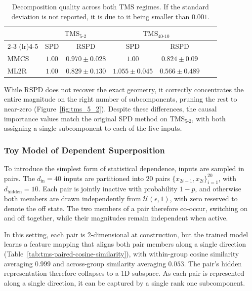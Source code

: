 \documentclass{article}
\begin{document}
\begin{table}[H]
\centering
\renewcommand{\arraystretch}{1.2}
\begin{tabular}{lcccccc}
\toprule
& \multicolumn{2}{c}{$\mathrm{TMS}_{5\text{-}2}$} & \multicolumn{2}{c}{$\mathrm{TMS}_{40\text{-}10}$} \\
\cmidrule(lr){2-3} \cmidrule(lr){4-5}
& SPD & RSPD & SPD & RSPD \\
\midrule
MMCS  & $1.00$ & $ 0.970 \pm 0.028$ & $1.00$ & $0.824 \pm 0.09$ \\
ML2R  & $1.00$ & $ 0.829 \pm 0.130$ & $1.055 \pm 0.045$ & $0.566 \pm 0.489$ \\
\bottomrule
\end{tabular}
\caption{Decomposition quality across both TMS regimes. If the standard deviation is not reported, it is due to it being smaller than $0.001$.}
\label{tab:tms_results_single}
\end{table}
While RSPD does not recover the exact geometry, it correctly concentrates the entire
magnitude on the right number of subcomponents, pruning the rest to near-zero
(Figure~\ref{fig:tms_5_2}). Despite 
these differences, the causal importance values match the original SPD method on
$\mathrm{TMS}_{5\text{-}2}$, with both assigning a single subcomponent to each of the five inputs.

\subsubsection{ Toy Model of Dependent Superposition}
\label{sec:tms-tied-experiment}

To introduce the simplest form of statistical dependence, inputs are
sampled in pairs. The $d_{\text{in}} = 40$ inputs are partitioned into
$20$ pairs $\{x_{2i-1}, x_{2i}\}_{i=1}^{20}$, with $d_{\text{hidden}} = 10$.
Each pair is jointly inactive with probability $1-p$, and otherwise both
members are drawn independently from $\mathcal{U}(\epsilon, 1)$, with zero
reserved to denote the off state. The two members of a pair therefore
co-occur, switching on and off together, while their magnitudes remain
independent when active.

In this setting, each pair is 2-dimensional at construction,
but the trained model learns a feature mapping that aligns both pair
members along a single direction
(Table~\ref{tab:tms-paired-cosine-similarity}),
with within-group cosine similarity averaging $0.999$ and across-group
similarity averaging $0.053$. The pair's hidden representation therefore
collapses to a 1D subspace. As each
pair is represented along a single direction, it can be captured by a single
rank one subcomponent.
\end{document}
